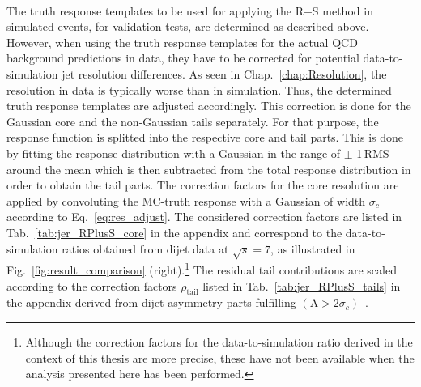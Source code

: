 \begin{table}[!t]
\centering
\caption{Overview of the $|\eta^\mathrm{gen}|$ and $\pt^\mathrm{gen}$ interval boundaries used for the MC-truth response determination used as input for the R+S method.}
\label{tab:RPlusS_binning}
\end{table} 
\\
The truth response templates to be used for applying the R+S method in simulated events, \eg for validation tests, are determined as described above. However, when using the truth response templates for the actual QCD background predictions in data, they have to be corrected for potential data-to-simulation jet resolution differences. As seen in Chap.~\ref{chap:Resolution}, the resolution in data is typically worse than in simulation. Thus, the determined truth response templates are adjusted accordingly. This correction is done for the Gaussian core and the non-Gaussian tails separately. For that purpose, the response function is splitted into the respective core and tail parts. This is done by fitting the response distribution with a Gaussian in the range of $\pm$ 1\,RMS around the mean which is then subtracted from the total response distribution in order to obtain the tail parts. The correction factors for the core resolution are applied by convoluting the MC-truth response with a Gaussian of width $\sigma_{c}$ according to Eq.~\ref{eq:res_adjust}. The considered correction factors are listed in Tab.~\ref{tab:jer_RPlusS_core} in the appendix and correspond to the data-to-simulation ratios obtained from dijet data at $\sqrt{s} = 7$\tev, as illustrated in Fig.~\ref{fig:result_comparison} (right).\footnote{Although the correction factors for the data-to-simulation ratio derived in the context of this thesis are more precise, these have not been available when the analysis presented here has been performed.} The residual tail contributions are scaled according to the correction factors $\rho_\mathrm{tail}$ listed in Tab.~\ref{tab:jer_RPlusS_tails} in the appendix derived from dijet asymmetry parts fulfilling $(\mathrm{A} > 2 \sigma_c)$~\cite{thesis:Schroeder}.    
